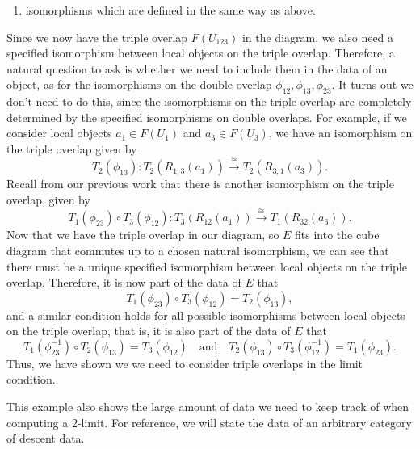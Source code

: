 \begin{answer}
\begin{enumerate}
\begin{align*}
            \phi_{12}: R_{1,2}(a_1) \xrightarrow{\cong} R_{2,1}(a_2) \text{ in } F(U_{12}), \\
            \phi_{13}: R_{1,3}(a_1) \xrightarrow{\cong} R_{3,1}(a_3) \text{ in } F(U_{13}), \\
            \phi_{23}: R_{2,3}(a_2) \xrightarrow{\cong} R_{3,2}(a_3) \text{ in } F(U_{23}),
        \end{align*}
        are chosen isomorphisms between local objects on double overlaps. 
        \item isomorphisms which are defined in the same way as above.
    \end{enumerate}
    Since we now have the triple overlap $F(U_{123})$ in the diagram, we also need a specified isomorphism between local objects on the triple overlap. Therefore, a natural question to ask is whether we need to include them in the data of an object, as for the isomorphisms on the double overlap $\phi_{12}, \phi_{13}, \phi_{23}$. It turns out we don't need to do this, since the isomorphisms on the triple overlap are completely determined by the specified isomorphisms on double overlaps. For example, if we consider local objects $a_1 \in F(U_1)$ and $a_3 \in F(U_3)$, we have an isomorphism on the triple overlap given by
    $$
    T_2(\phi_{13}): T_2(R_{1,3}(a_1)) \xrightarrow{\cong} T_2(R_{3,1}(a_3)).
    $$
    Recall from our previous work that there is another isomorphism on the triple overlap, given by
    $$
    T_1 (\phi_{23}) \circ T_3 (\phi_{12}): T_3(R_{12}(a_1)) \xrightarrow{\cong} T_1(R_{32}(a_3)).
    $$
    Now that we have the triple overlap in our diagram, so $E$ fits into the cube diagram that commutes up to a chosen natural isomorphism, we can see that there must be a unique specified isomorphism between local objects on the triple overlap. Therefore, it is now part of the data of $E$ that
    $$
    T_1 (\phi_{23}) \circ T_3 (\phi_{12}) = T_2(\phi_{13}),
    $$
    and a similar condition holds for all possible isomorphisms between local objects on the triple overlap, that is, it is also part of the data of $E$ that
    $$
    T_1 (\phi_{23}^{-1}) \circ T_2 (\phi_{13}) = T_3(\phi_{12}) \quad \text{and} \quad T_2(\phi_{13}) \circ T_3 (\phi_{12}^{-1}) = T_1(\phi_{23}).
    $$
    Thus, we have shown we we need to consider triple overlaps in the limit condition.
\end{answer}

\begin{remark}
    This example also shows the large amount of data we need to keep track of when computing a 2-limit. For reference, we will state the data of an arbitrary category of descent data.
\end{remark}

